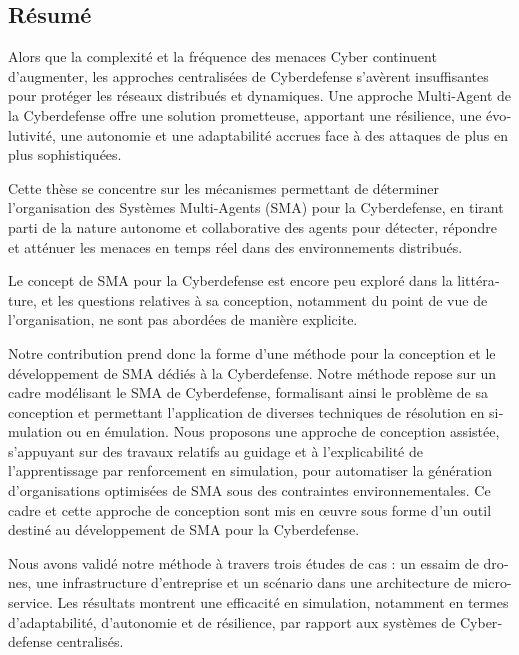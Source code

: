 \begingroup
\let\clearpage\relax
\let\cleardoublepage\relax
\let\cleardoublepage\relax

\begin{otherlanguage}{ngerman}
    \chapter*{Résumé}

    Alors que la complexité et la fréquence des menaces Cyber continuent d'augmenter, les approches centralisées de Cyberdefense s'avèrent insuffisantes pour protéger les réseaux distribués et dynamiques. Une approche Multi-Agent de la Cyberdefense offre une solution prometteuse, apportant une résilience, une évolutivité, une autonomie et une adaptabilité accrues face à des attaques de plus en plus sophistiquées.

    Cette thèse se concentre sur les mécanismes permettant de déterminer l'organisation des Systèmes Multi-Agents (SMA) pour la Cyberdefense, en tirant parti de la nature autonome et collaborative des agents pour détecter, répondre et atténuer les menaces en temps réel dans des environnements distribués.
    
    Le concept de SMA pour la Cyberdefense est encore peu exploré dans la littérature, et les questions relatives à sa conception, notamment du point de vue de l'organisation, ne sont pas abordées de manière explicite.
    
    Notre contribution prend donc la forme d'une méthode pour la conception et le développement de SMA dédiés à la Cyberdefense. Notre méthode repose sur un cadre modélisant le SMA de Cyberdefense, formalisant ainsi le problème de sa conception et permettant l'application de diverses techniques de résolution en simulation ou en émulation. Nous proposons une approche de conception assistée, s'appuyant sur des travaux relatifs au guidage et à l'explicabilité de l'apprentissage par renforcement en simulation, pour automatiser la génération d'organisations optimisées de SMA sous des contraintes environnementales. Ce cadre et cette approche de conception sont mis en œuvre sous forme d'un outil destiné au développement de SMA pour la Cyberdefense.
    
    Nous avons validé notre méthode à travers trois études de cas : un essaim de drones, une infrastructure d'entreprise et un scénario dans une architecture de micro-service. Les résultats montrent une efficacité en simulation, notamment en termes d'adaptabilité, d'autonomie et de résilience, par rapport aux systèmes de Cyberdefense centralisés.


\end{otherlanguage}
